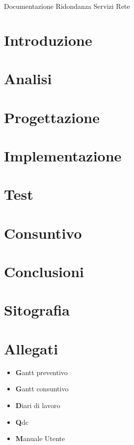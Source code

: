 \documentclass[a4paper]{article}
\begin{document}
{\LARGE Documentazione Ridondanza Servizi Rete}

\pagebreak{}
\thispagestyle{header-pages}
\tableofcontents

\pagebreak{}
\thispagestyle{header-pages}

\section{Introduzione}

\pagebreak{}

\thispagestyle{header-pages}
\section{Analisi}

\pagebreak{}

\thispagestyle{header-pages}
\section{Progettazione}

\pagebreak{}

\thispagestyle{header-pages}
\section{Implementazione}

\pagebreak{}

\thispagestyle{header-pages}
\section{Test}

\pagebreak{}

\thispagestyle{header-pages}
\section{Consuntivo}
\pagebreak{}

\thispagestyle{header-pages}
\section{Conclusioni}

\pagebreak{}

\thispagestyle{header-pages}
\section{Sitografia}
\nocite{*}
\printbibliography[type=online, heading=subbibliography, title=Sitografia]

\section{Allegati}
 \begin{itemize}
    \item \textbf Gantt preventivo
    \item \textbf Gantt consuntivo
    \item \textbf Diari di lavoro
    \item \textbf Qdc
    \item \textbf Manuale Utente
\end{itemize}
\pagebreak{}
\end{document}
